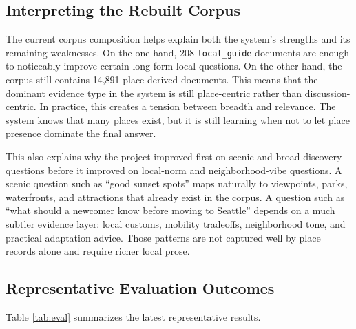 \documentclass[11pt]{article}
\begin{document}
\subsection{Interpreting the Rebuilt Corpus}
The current corpus composition helps explain both the system's strengths and its remaining weaknesses. On the one hand, 208 \texttt{local\_guide} documents are enough to noticeably improve certain long-form local questions. On the other hand, the corpus still contains 14,891 place-derived documents. This means that the dominant evidence type in the system is still place-centric rather than discussion-centric. In practice, this creates a tension between breadth and relevance. The system knows that many places exist, but it is still learning when not to let place presence dominate the final answer.

This also explains why the project improved first on scenic and broad discovery questions before it improved on local-norm and neighborhood-vibe questions. A scenic question such as ``good sunset spots'' maps naturally to viewpoints, parks, waterfronts, and attractions that already exist in the corpus. A question such as ``what should a newcomer know before moving to Seattle'' depends on a much subtler evidence layer: local customs, mobility tradeoffs, neighborhood tone, and practical adaptation advice. Those patterns are not captured well by place records alone and require richer local prose.

\subsection{Representative Evaluation Outcomes}
Table \ref{tab:eval} summarizes the latest representative results.
\end{document}
